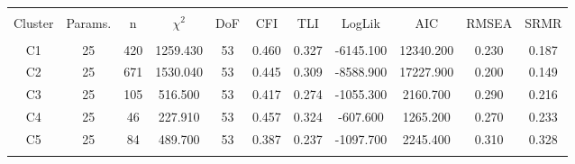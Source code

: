 
\begin{table}[!htbp] \centering 
  \caption{} 
  \label{full_model_fit_clust_stats} 
\begin{tabular}{@{\extracolsep{0pt}} ccccccccccc} 
\\[-1.8ex]\hline 
\hline \\[-1.8ex] 
{Cluster} & {Params.} & {n} & {$\chi^{2}$} & {DoF} & {CFI} & {TLI} & {LogLik} & {AIC} & {RMSEA} & {SRMR} \\
\hline \\[-1.8ex] 
C1 & 25 & 420 & 1259.430 & 53 & 0.460 & 0.327 & -6145.100 & 12340.200 & 0.230 & 0.187 \\ 
C2 & 25 & 671 & 1530.040 & 53 & 0.445 & 0.309 & -8588.900 & 17227.900 & 0.200 & 0.149 \\ 
C3 & 25 & 105 & 516.500 & 53 & 0.417 & 0.274 & -1055.300 & 2160.700 & 0.290 & 0.216 \\ 
C4 & 25 & 46 & 227.910 & 53 & 0.457 & 0.324 & -607.600 & 1265.200 & 0.270 & 0.233 \\ 
C5 & 25 & 84 & 489.700 & 53 & 0.387 & 0.237 & -1097.700 & 2245.400 & 0.310 & 0.328 \\ 
\hline \\[-1.8ex] 
\end{tabular} 
\end{table} 
